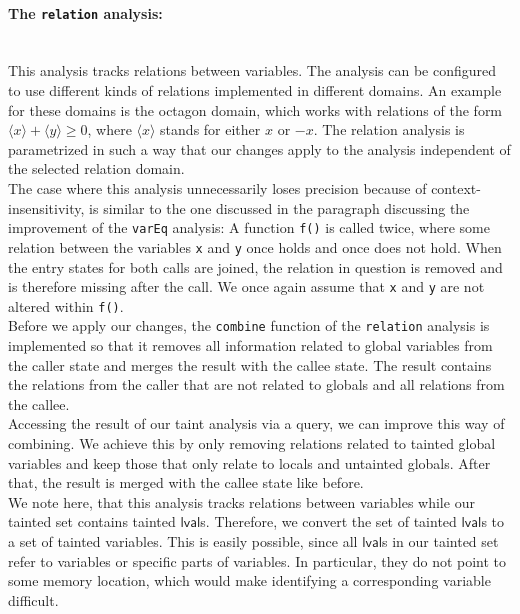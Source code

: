       \paragraph{The \texttt{relation} analysis:}\mbox{}\\
        This analysis tracks relations between variables. The analysis can be configured to use different kinds of relations implemented in different domains. An example for these domains is the octagon domain, which works with relations of the form $\langle x \rangle + \langle y \rangle \geq 0$, where $\langle x \rangle$ stands for either $x$ or $-x$. The relation analysis is parametrized in such a way that our changes apply to the analysis independent of the selected relation domain.\\
        The case where this analysis unnecessarily loses precision because of context-insensitivity, is similar to the one discussed in the paragraph discussing the improvement of the \texttt{varEq} analysis: A function \texttt{f()} is called twice, where some relation between the variables \texttt{x} and \texttt{y} once holds and once does not hold. When the entry states for both calls are joined, the relation in question is removed and is therefore missing after the call. We once again assume that \texttt{x} and \texttt{y} are not altered within \texttt{f()}.\\
        Before we apply our changes, the \texttt{combine} function of the \texttt{relation} analysis is implemented so that it removes all information related to global variables from the caller state and merges the result with the callee state. The result contains the relations from the caller that are not related to globals and all relations from the callee.\\
        Accessing the result of our taint analysis via a query, we can improve this way of combining. We achieve this by only removing relations related to tainted global variables and keep those that only relate to locals and untainted globals. After that, the result is merged with the callee state like before.\\
        We note here, that this analysis tracks relations between variables while our tainted set contains tainted $\textsf{lval}$s. Therefore, we convert the set of tainted $\textsf{lval}$s to a set of tainted variables. This is easily possible, since all $\textsf{lval}$s in our tainted set refer to variables or specific parts of variables. In particular, they do not point to some memory location, which would make identifying a corresponding variable difficult.

